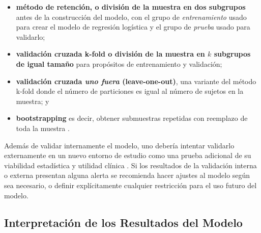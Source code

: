 \documentclass[12pt]{article}
\begin{document}
\begin{itemize}
\item \textbf{m\'etodo de retenci\'on, o divisi\'on de la muestra en dos subgrupos} antes de la construcci\'on del modelo, con el grupo de \textit{entrenamiento} usado para crear el modelo de regresi\'on log\'istica y el grupo de \textit{prueba} usado para validarlo; \cite{altman2000, kohavi1995} 

\item \textbf{validaci\'on cruzada k-fold o divisi\'on de la muestra en $k$ subgrupos de igual tama\~no} para prop\'ositos de entrenamiento y validaci\'on;\cite{kohavi1995} 

\item \textbf{validaci\'on cruzada \textit{uno fuera} (leave-one-out)}, una variante del m\'etodo k-fold donde el n\'umero de particiones es igual al n\'umero de sujetos en la muestra;\cite{kohavi1995} y 

\item \textbf{bootstrapping} es decir, obtener submuestras repetidas con reemplazo de toda la muestra \cite{kohavi1995,efron1993}.
\end{itemize}

Adem\'as de validar internamente el modelo, uno deber\'ia intentar validarlo externamente en un nuevo entorno de estudio como una prueba adicional de su viabilidad estad\'istica y utilidad cl\'inica \cite{altman2000,miller1991}. Si los resultados de la validaci\'on interna o externa presentan alguna alerta se recomienda hacer ajustes al modelo seg\'un sea necesario, o definir expl\'icitamente cualquier restricci\'on para el uso futuro del modelo.\cite{miller1991}

\subsection{Interpretaci\'on de los Resultados del Modelo}
\end{document}

